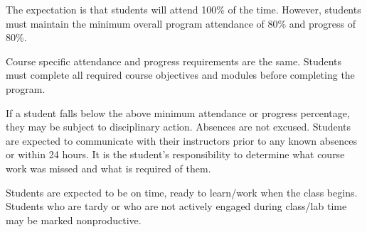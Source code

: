 The expectation is that students will attend 100\% of the time.
However, students must maintain the minimum overall program attendance
of 80\% and progress of 80\%.
\par
\bigskip
Course specific attendance and progress requirements are the same.
Students must complete all required course objectives and modules
before completing the program.
\par
\bigskip
If a student falls below the above minimum attendance or progress
percentage, they may be subject to disciplinary action.
Absences are not excused. Students are expected to communicate
with their instructors prior to any known absences or within 24 hours.
It is the student’s responsibility to determine what course work was
missed and what is required of them.
\par
\bigskip
Students are expected to be on time, ready to learn/work when
the class begins. Students who are tardy or who are not actively
engaged during class/lab time may be marked nonproductive.
